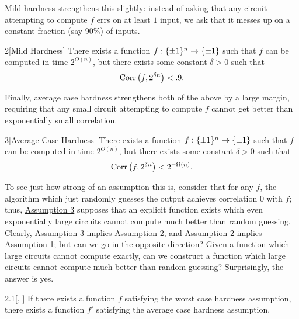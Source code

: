 \documentclass[11pt]{article}
\begin{document}
Mild hardness strengthens this slightly: instead of asking that any circuit attempting to compute $f$ errs on at least $1$ input, we ask that it messes up on a constant fraction (say 90\%) of inputs.

\begin{assumption}{2}[Mild Hardness] \label{a-2}
    There exists a function $f : \{\pm 1\}^n \rightarrow \{\pm 1\}$ such that $f$ can be computed in time $2^{O(n)}$, but there exists some constant $\delta > 0$ such that 
    \begin{equation*}
        \mathrm{Corr}\left(f, 2^{\delta n}\right) < .9.
    \end{equation*}
\end{assumption}

Finally, average case hardness strengthens both of the above by a large margin, requiring that any small circuit attempting to compute $f$ cannot get better than exponentially small correlation.

\begin{assumption}{3}[Average Case Hardness] \label{a-3}
    There exists a function $f : \{\pm 1\}^n \rightarrow \{\pm 1\}$ such that $f$ can be computed in time $2^{O(n)}$, but there exists some constant $\delta > 0$ such that 
    \begin{equation*}
        \mathrm{Corr}\left(f, 2^{\delta n}\right) < 2^{-\Omega(n)}.
    \end{equation*}
\end{assumption}

To see just how strong of an assumption this is, consider that for any $f$, the algorithm which just randomly guesses the output achieves correlation $0$ with $f$; thus, \hyperref[a-3]{Assumption 3} supposes that an explicit function exists which even exponentially large circuits cannot compute much better than random guessing. Clearly, \hyperref[a-3]{Assumption 3} implies \hyperref[a-2]{Assumption 2}, and \hyperref[a-2]{Assumption 2} implies \hyperref[a-1]{Assumption 1}; but can we go in the opposite direction? Given a function which large circuits cannot compute exactly, can we construct a function which large circuits cannot compute much better than random guessing? Surprisingly, the answer is yes.

\begin{theorem}{2.1}[\cite{iw97}, \cite{STV99}]\label{t-2-1}
    If there exists a function $f$ satisfying the worst case hardness assumption, there exists a function $f'$ satisfying the average case hardness assumption.
\end{theorem}
\end{document}
